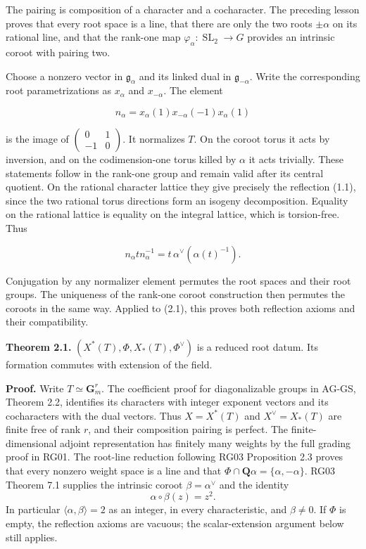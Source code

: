 \documentclass[11pt,a4paper,openany]{report}
\begin{document}
The pairing is composition of a character and a cocharacter. The preceding lesson proves that every root space is a line, that there are only the two roots \(\pm\alpha\) on its rational line, and that the rank-one map \(\varphi_\alpha:\operatorname{SL}_2\to G\) provides an intrinsic coroot with pairing two.

Choose a nonzero vector in \(\mathfrak g_\alpha\) and its linked dual in \(\mathfrak g_{-\alpha}\). Write the corresponding root parametrizations as \(x_\alpha\) and \(x_{-\alpha}\). The element

\[
n_\alpha=x_\alpha(1)x_{-\alpha}(-1)x_\alpha(1)
\tag{2.1}
\]

is the image of \(\begin{pmatrix}0&1\\-1&0\end{pmatrix}\). It normalizes \(T\). On the coroot torus it acts by inversion, and on the codimension-one torus killed by \(\alpha\) it acts trivially. These statements follow in the rank-one group and remain valid after its central quotient. On the rational character lattice they give precisely the reflection (1.1), since the two rational torus directions form an isogeny decomposition. Equality on the rational lattice is equality on the integral lattice, which is torsion-free. Thus

\[
n_\alpha t n_\alpha^{-1}
=t\,\alpha^\vee(\alpha(t)^{-1}).
\tag{2.2}
\]

Conjugation by any normalizer element permutes the root spaces and their root groups. The uniqueness of the rank-one coroot construction then permutes the coroots in the same way. Applied to (2.1), this proves both reflection axioms and their compatibility.

\textbf{Theorem 2.1.} \((X^*(T),\Phi,X_*(T),\Phi^\vee)\) is a reduced root datum. Its formation commutes with extension of the field.

\textbf{Proof.} Write \(T\simeq\mathbf G_m^r\). The coefficient proof for diagonalizable groups in AG-GS, Theorem 2.2, identifies its characters with integer exponent vectors and its cocharacters with the dual vectors. Thus \(X=X^*(T)\) and \(X^\vee=X_*(T)\) are finite free of rank \(r\), and their composition pairing is perfect. The finite-dimensional adjoint representation has finitely many weights by the full grading proof in RG01. The root-line reduction following RG03 Proposition 2.3 proves that every nonzero weight space is a line and that \(\Phi\cap\mathbf Q\alpha=\{\alpha,-\alpha\}\). RG03 Theorem 7.1 supplies the intrinsic coroot \(\beta=\alpha^\vee\) and the identity \[
                 \alpha\circ\beta(z)=z^2.
\] In particular \(\langle\alpha,\beta\rangle=2\) as an integer, in every characteristic, and \(\beta\ne0\). If \(\Phi\) is empty, the reflection axioms are vacuous; the scalar-extension argument below still applies.
\end{document}
